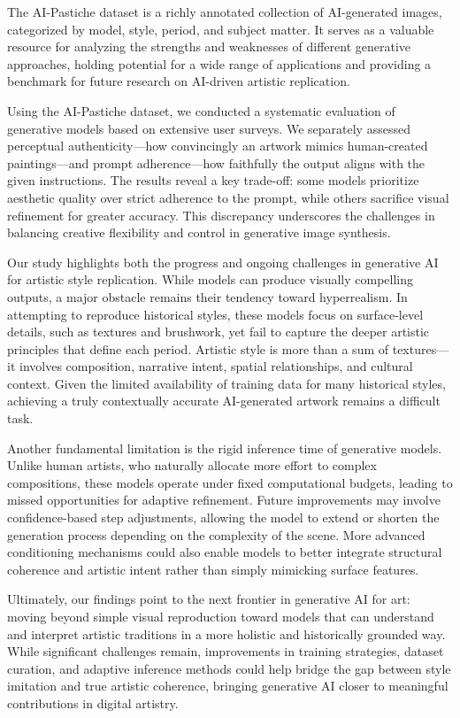\documentclass[sn-mathphys]{sn-jnl}
\begin{document}
The AI-Pastiche dataset is a richly annotated collection of AI-generated images, categorized by model, style, period, and subject matter. It serves as a valuable resource for analyzing the strengths and weaknesses of different generative approaches, holding potential for a wide range of applications and providing a benchmark for future research on AI-driven artistic replication.

Using the AI-Pastiche dataset, we conducted a systematic evaluation of generative models based on extensive user surveys. We separately assessed perceptual authenticity—how convincingly an artwork mimics human-created paintings—and prompt adherence—how faithfully the output aligns with the given instructions. The results reveal a key trade-off: some models prioritize aesthetic quality over strict adherence to the prompt, while others sacrifice visual refinement for greater accuracy. This discrepancy underscores the challenges in balancing creative flexibility and control in generative image synthesis.

Our study highlights both the progress and ongoing challenges in generative AI for artistic style replication. While models can produce visually compelling outputs, a major obstacle remains their tendency toward hyperrealism. In attempting to reproduce historical styles, these models focus on surface-level details, such as textures and brushwork, yet fail to capture the deeper artistic principles that define each period. Artistic style is more than a sum of textures—it involves composition, narrative intent, spatial relationships, and cultural context. Given the limited availability of training data for many historical styles, achieving a truly contextually accurate AI-generated artwork remains a difficult task.

Another fundamental limitation is the rigid inference time of generative models. Unlike human artists, who naturally allocate more effort to complex compositions, these models operate under fixed computational budgets, leading to missed opportunities for adaptive refinement. Future improvements may involve confidence-based step adjustments, allowing the model to extend or shorten the generation process depending on the complexity of the scene. More advanced conditioning mechanisms could also enable models to better integrate structural coherence and artistic intent rather than simply mimicking surface features.

Ultimately, our findings point to the next frontier in generative AI for art: moving beyond simple visual reproduction toward models that can understand and interpret artistic traditions in a more holistic and historically grounded way. While significant challenges remain, improvements in training strategies, dataset curation, and adaptive inference methods could help bridge the gap between style imitation and true artistic coherence, bringing generative AI closer to meaningful contributions in digital artistry.
\end{document}
